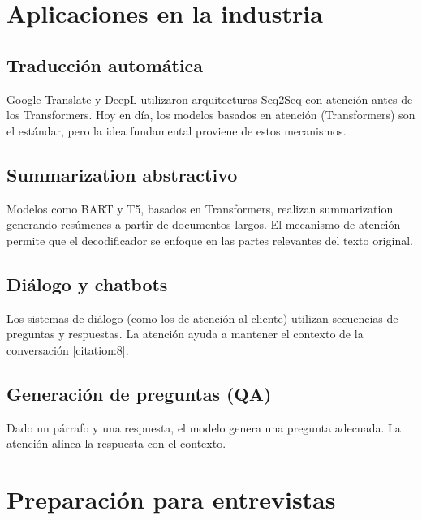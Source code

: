 \documentclass[12pt,a4paper,openany,oneside]{book}
\begin{document}
\section{Aplicaciones en la industria}

\subsection{Traducción automática}
Google Translate y DeepL utilizaron arquitecturas Seq2Seq con atención antes de los Transformers. Hoy en día, los modelos basados en atención (Transformers) son el estándar, pero la idea fundamental proviene de estos mecanismos.

\subsection{Summarization abstractivo}
Modelos como BART y T5, basados en Transformers, realizan summarization generando resúmenes a partir de documentos largos. El mecanismo de atención permite que el decodificador se enfoque en las partes relevantes del texto original.

\subsection{Diálogo y chatbots}
Los sistemas de diálogo (como los de atención al cliente) utilizan secuencias de preguntas y respuestas. La atención ayuda a mantener el contexto de la conversación [citation:8].

\subsection{Generación de preguntas (QA)}
Dado un párrafo y una respuesta, el modelo genera una pregunta adecuada. La atención alinea la respuesta con el contexto.

\section{Preparación para entrevistas}
\end{document}
